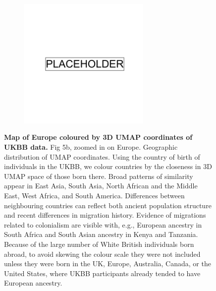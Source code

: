 \begin{figure}
    \centering
    \begin{subfigure}{\textwidth}
    \includegraphics[width=0.7\textwidth]{placeholder.png}
    \end{subfigure}
    \caption[Map of Europe coloured by 3D UMAP coordinates of UKBB data]{\textbf{Map of Europe coloured by 3D UMAP coordinates of UKBB data.} Fig 5b, zoomed in on Europe. Geographic distribution of UMAP coordinates. Using the country of birth of individuals in the UKBB, we colour countries by the closeness in 3D UMAP space of those born there. Broad patterns of similarity appear in East Asia, South Asia, North African and the Middle East, West Africa, and South America. Differences between neighbouring countries can reflect both ancient population structure and recent differences in migration history. Evidence of migrations related to colonialism are visible with, e.g., European ancestry in South Africa and South Asian ancestry in Kenya and Tanzania. Because of the large number of White British individuals born abroad, to avoid skewing the colour scale they were not included unless they were born in the UK, Europe, Australia, Canada, or the United States, where UKBB participants already tended to have European ancestry.}
    \label{fig:supp_umap_ukbb_eur}
\end{figure}

\newpage

